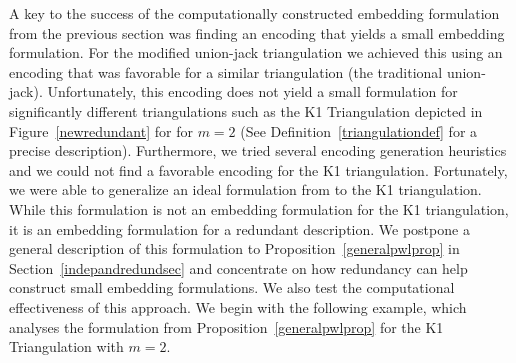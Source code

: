 \documentclass[mnsc]{informs3}
\begin{document}
A key to the success of the computationally constructed embedding formulation from the previous section was finding an encoding that yields a small embedding formulation. For the modified union-jack triangulation we achieved this using an encoding that was favorable for a similar triangulation (the traditional union-jack). Unfortunately, this encoding does not yield a small formulation for significantly different triangulations such as the K1 Triangulation  depicted in Figure~\ref{newredundant} for for $m=2$ (See Definition~\ref{triangulationdef} for a precise description). Furthermore, we tried several encoding generation heuristics and we could not find a favorable encoding for the K1 triangulation. Fortunately, we were able to generalize an ideal formulation from \cite{Modeling-Disjunctive-Constraints-FULL} to the K1 triangulation. While this formulation is not an embedding formulation for the K1 triangulation, it is an embedding formulation for a redundant description. We postpone a general description of this formulation to Proposition~\ref{generalpwlprop} in Section~\ref{indepandredundsec} and concentrate on how redundancy can help construct small embedding formulations. We also test the computational effectiveness of this approach. We begin with the following example, which analyses the formulation from Proposition~\ref{generalpwlprop} for the K1 Triangulation with $m=2$.
\end{document}
